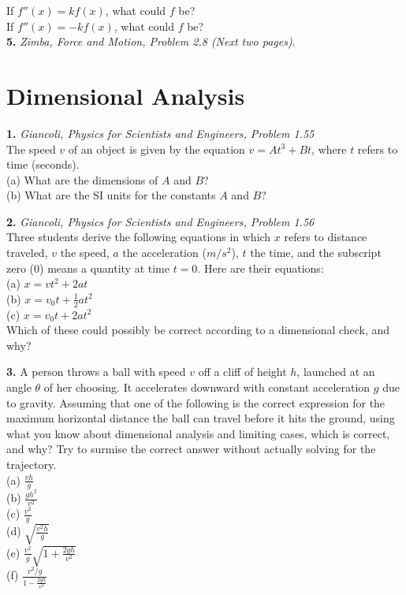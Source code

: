 \documentclass[11pt]{article}
\theoremstyle{gangnamstyle}{\newtheorem{definition}{Definition}[]}
\theoremstyle{gangnamstyle}{\newtheorem{example}{Example}[]}
\theoremstyle{gangnamstyle}{\newtheorem{problem}{Problem}[]}
\begin{document}
If $f''(x) = kf(x)$, what could $f$ be? \\

If $f''(x) = -kf(x)$, what could $f$ be? \\

\textbf{5.} \textit{Zimba, Force and Motion, Problem 2.8 (Next two pages)}. 



\section{Dimensional Analysis}

\textbf{1.} \textit{Giancoli, Physics for Scientists and Engineers, Problem 1.55} \\
The speed $v$ of an object is given by the equation $v = At^3 + Bt$, where $t$ refers to time (seconds). \\
(a) What are the dimensions of $A$ and $B$? \\
(b) What are the SI units for the constants $A$ and $B$? \\
\vspace{0.5 in}

\textbf{2.} \textit{Giancoli, Physics for Scientists and Engineers, Problem 1.56} \\
Three students derive the following equations in which $x$ refers to distance traveled, $v$ the speed, $a$ the acceleration ($m/s^2$), $t$ the time, and the subscript zero ($0$) means a quantity at time $t = 0$. Here are their equations: \\
(a) $x = vt^2 + 2at$ \\
(b) $x = v_0t + \frac{1}{2}at^2$ \\
(c) $x = v_0t + 2at^2$ \\
Which of these could possibly be correct according to a dimensional check, and why?
\vspace{0.5 in}

\textbf{3.} A person throws a ball with speed $v$ off a cliff of height $h$, launched at an angle $\theta$ of her choosing. It accelerates downward with constant acceleration $g$ due to gravity. Assuming that one of the following is the correct expression for the maximum horizontal distance the ball can travel before it hits the ground, using what you know about dimensional analysis and limiting cases, which is correct, and why? Try to surmise the correct answer without actually solving for the trajectory. \\
(a) $\frac{vh}{g}$ \\

(b) $\frac{gh^2}{v^2}$ \\

(c) $\frac{v^2}{g}$ \\

(d) $\sqrt{\frac{v^2h}{g}}$ \\

(e) $\frac{v^2}{g}\sqrt{1 + \frac{2gh}{v^2}}$ \\

(f) $\frac{v^2 / g}{1 - \frac{2gh}{v^2}}$ \\
\end{document}
